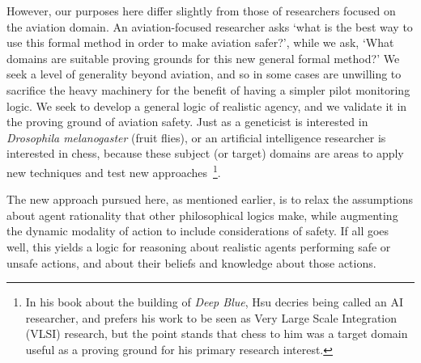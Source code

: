 However, our purposes here differ slightly from those of researchers focused on the aviation domain. An aviation-focused researcher asks `what is the best way to use this formal method in order to make aviation safer?', while we ask, `What domains are suitable proving grounds for this new general formal method?' We seek a level of generality beyond aviation, and so in some cases are unwilling to sacrifice the heavy machinery for the benefit of having a simpler pilot monitoring logic. We seek to develop a general logic of realistic agency, and we validate it in the proving ground of aviation safety. Just as a geneticist is interested in \emph{Drosophila melanogaster} (fruit flies), or an artificial intelligence researcher is interested in chess, because these subject (or target) domains are areas to apply new techniques and test new approaches~\cite{Kohler,Hsu}\footnote{In his book about the building of \emph{Deep Blue}, Hsu decries being called an AI researcher, and prefers his work to be seen as Very Large Scale Integration (VLSI) research, but the point stands that chess to him was a target domain useful as a proving ground for his primary research interest.}. 

The new approach pursued here, as mentioned earlier, is to relax the assumptions about agent rationality that other philosophical logics make, while augmenting the dynamic modality of action to include considerations of safety. If all goes well, this yields a logic for reasoning about realistic agents performing safe or unsafe actions, and about their beliefs and knowledge about those actions.





